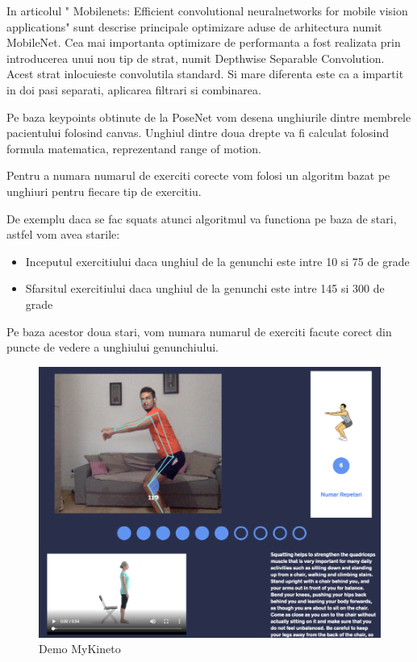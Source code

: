 In articolul " Mobilenets:  Efficient  convolutional  neuralnetworks for mobile vision applications"  \cite{DBLP:journals/corr/HowardZCKWWAA17} sunt descrise principale optimizare aduse de arhitectura numit MobileNet.
Cea mai importanta optimizare de performanta a fost realizata prin introducerea unui nou tip de strat, numit Depthwise Separable Convolution. Acest strat inlocuieste convolutila standard. Si mare diferenta este ca a impartit in doi pasi separati, aplicarea filtrari si combinarea.

Pe baza keypoints obtinute de la PoseNet vom desena unghiurile dintre membrele pacientului folosind canvas.
Unghiul dintre doua drepte va fi calculat folosind formula matematica, reprezentand range of motion.

Pentru a numara numarul de exerciti corecte vom folosi un algoritm bazat pe unghiuri pentru fiecare tip de exercitiu.

De exemplu daca se fac squats atunci algoritmul va functiona pe baza de stari, astfel vom avea starile:
\begin{itemize}
    \item Inceputul exercitiului daca unghiul de la genunchi este intre 10 si 75 de grade
    \item Sfarsitul exercitiului daca unghiul de la genunchi este intre 145 si 300 de grade
\end{itemize}

Pe baza acestor doua stari, vom numara numarul de exerciti facute corect din puncte de vedere a unghiului genunchiului.

 \begin{figure}[htbp]
	\centerline{\includegraphics[scale=0.7]{fig/demo-mykineto.png}}  
	\caption{Demo MyKineto}
	\label{fig:demo-web-mykineto}
\end{figure}

